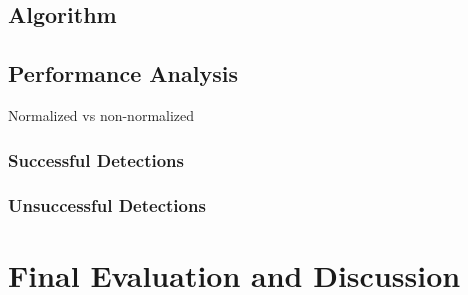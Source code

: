 \documentclass[10pt,a4paper,twocolumn]{report}
\begin{document}
\section{Algorithm}

\section{Performance Analysis}

Normalized vs non-normalized

\subsection{Successful Detections}

\subsection{Unsuccessful Detections}

\chapter{Final Evaluation and Discussion}
\end{document}
